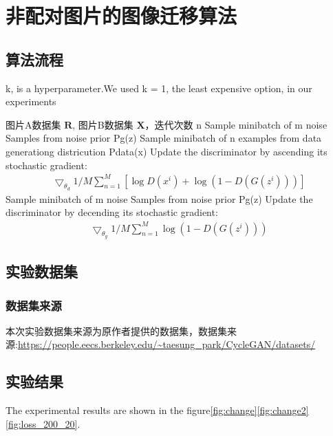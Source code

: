 \chapter{\heiti \label{ch3} 非配对图片的图像迁移算法}

\section{\heiti \label{sec:2.1}算法流程}
\begin{algorithm}[thb]
	\caption{k, is a hyperparameter.We used k = 1, the least expensive option, in our experiments}
    \label{alg}
	\begin{algorithmic}[1]
	\REQUIRE  图片A数据集 $\mathbf{R}$,  图片B数据集 $\mathbf{X}$，迭代次数 n 
      \STATE{}
      \STATE Sample minibatch of m noise Samples from noise prior Pg(z)
      \STATE Sample minibatch of n examples from data generationg districution Pdata(x)
      \STATE Update the discriminator by ascending its stochastic gradient:
      \STATE \begin{align}
        \bigtriangledown_{\theta_{d}} 1/M \sum_{n=1}^M [\log D(x^{i}) + \log (1-D(G(z^{i})))]
      \end{align}
      \STATE\ENDFOR
      \STATE Sample minibatch of m noise Samples from noise prior Pg(z)
      \STATE Update the discriminator by decending its stochastic gradient:
      \STATE \begin{align}
        \bigtriangledown_{\theta_{g}} 1/M \sum_{n=1}^M \log (1-D(G(z^{i})))
      \end{align}
    \ENDFOR

	\end{algorithmic}
\end{algorithm}

\section{\heiti \label{sec:2.2}实验数据集}

\subsection{\heiti 数据集来源}
本次实验数据集来源为原作者提供的数据集，数据集来源:\url{https://people.eecs.berkeley.edu/~taesung_park/CycleGAN/datasets/}

\section{\heiti \label{sec:2.2}实验结果}
The experimental results are shown in the figure\ref{fig:change}\ref{fig:change2}\ref{fig:loss_200_20}.

